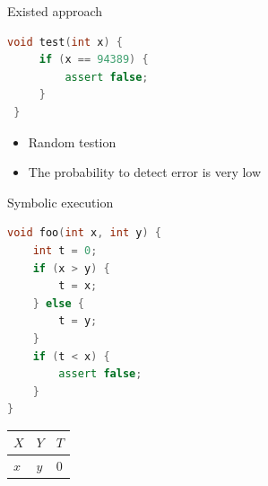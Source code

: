 \documentclass{beamer}
\begin{document}
\begin{frame}[fragile]{Existed approach}
\begin{minipage}{0.49\textwidth}
\begin{lstlisting}[language=C++]
 void test(int x) {
     if (x == 94389) {
         assert false;
     }
 }
\end{lstlisting}
\end{minipage}
\begin{minipage}{0.49\textwidth}
\begin{itemize}
\item Random testion
\item The probability to detect error is very low
\end{itemize}
\end{minipage}
\end{frame}

\begin{frame}[fragile]{Symbolic execution}
\begin{minipage}{0.49\textwidth}
\begin{lstlisting}[language=C++]
void foo(int x, int y) {
    int t = 0;
    if (x > y) {
        t = x;
    } else {
        t = y;
    }
    if (t < x) {
        assert false;
    }
}
\end{lstlisting}
\end{minipage}
\hfill
\begin{minipage}{0.49\textwidth}
\begin{center}
\begin{tabular}{ | l | l | l | }
\hline
$X$ & $Y$ & $T$ \\
\hline
$x$ & $y$ & 0 \\
\hline
\end{tabular}
\end{center}
\end{minipage}
\end{frame}
\end{document}
